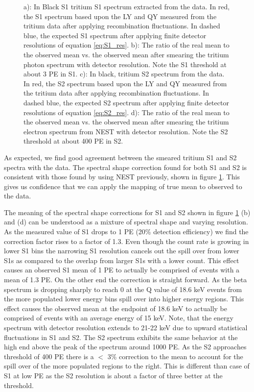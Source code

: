 \begin{figure}[h!]
\caption{a): In Black S1 tritium S1 spectrum extracted from the data. In red, the S1 spectrum based upon the LY and QY measured from the tritium data after applying recombination fluctuations. In dashed blue, the expected S1 spectrum after applying finite detector resolutions of equation \ref{eq:S1_res}.  b): The ratio of the real mean to the observed mean vs. the observed mean after smearing the tritium photon spectrum with detector resolution. Note the S1 threshold at about 3 PE in S1. c): In black, tritium S2 spectrum from the data. In red, the S2 spectrum based upon the LY and QY measured from the tritium data after applying recombination fluctuations. In dashed blue, the expected S2 spectrum after applying finite detector resolutions of equation \ref{eq:S2_res}. d): The ratio of the real mean to the observed mean vs. the observed mean after smearing the tritium electron spectrum from NEST with detector resolution. Note the S2 threshold at about 400 PE in S2.   }
\label{fig:S1S2_mapping_2}
\end{figure}
\renewcommand{\baselinestretch}{2}
\small\normalsize


As expected, we find good agreement between the smeared tritium S1 and S2 spectra with the data. The spectral shape correction found for both S1 and S2 is consistent with those found by using NEST previously, shown in figure \ref{fig:S1S2_mapping_2}. This gives us confidence that we can apply the mapping of true mean to observed to the data. 

The meaning of the spectral shape corrections for S1 and S2 shown in figure \ref{fig:S1S2_mapping_2} (b) and (d) can be understood as a mixture of spectral shape and varying resolution. As the measured value of S1 drops to 1 PE (20\% detection efficiency) we find the correction factor rises to a factor of 1.3. Even though the count rate is growing in lower S1 bins the narrowing S1 resolution cancels out the spill over from lower S1s as compared to the overlap from larger S1s with a lower count. This effect causes an observed S1 mean of 1 PE to actually be comprised of events with a mean of 1.3 PE. On the other end the correction is straight forward. As the beta spectrum is dropping sharply to reach 0 at the Q value of 18.6 keV \cite{Tritium_Q} events from the more populated lower energy bins spill over into higher energy regions. This effect causes the observed mean at the endpoint of 18.6 keV to actually be comprised of events with an average energy of 15 keV. Note, that the energy spectrum with detector resolution extends to 21-22 keV due to upward statistical fluctuations in S1 and S2. The S2 spectrum exhibits the same behavior at the high end above the peak of the spectrum around 1000 PE. As the S2 approaches threshold of 400 PE there is a $<$ 3\% correction to the mean to account for the spill over of the more populated regions to the right. This is different than case of S1 at low PE as the S2 resolution is about a factor of three better at the threshold.

